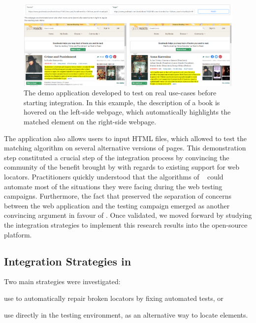 \begin{figure}[]
    \centering
    \includegraphics[width=\linewidth]{cerberus/explanations/demo_matching}
    \caption{The demo application developed to test \erratum on real use-cases before starting integration. In this example, the description of a book is hovered on the left-side webpage, which automatically highlights the matched element on the right-side webpage.}
    \label{fig:demo_app}
\end{figure}

The application also allows users to input HTML files, which allowed to test the matching algorithm on several alternative versions of pages.
This demonstration step constituted a crucial step of the integration process by convincing the \cerberus community of the benefit brought by \erratum with regards to existing support for web locators.
Practitioners quickly understood that the algorithms of \erratum~\cite{brisset2021erratum,brisset2020sftm} could automate most of the situations they were facing during the web testing campaigns.
Furthermore, the fact that \erratum preserved the separation of concerns between the web application and the testing campaign emerged as another convincing argument in favour of \erratum.
Once validated, we moved forward by studying the integration strategies to implement this research results into the open-source platform.

\subsection{Integration Strategies in \cerberus}
Two main strategies were investigated:
\begin{inparaenum}[\em (i)]
\item use \erratum to automatically repair broken locators by fixing automated tests, or
\item use \erratum directly in the \cerberus testing environment, as an alternative way to locate elements.
\end{inparaenum}

